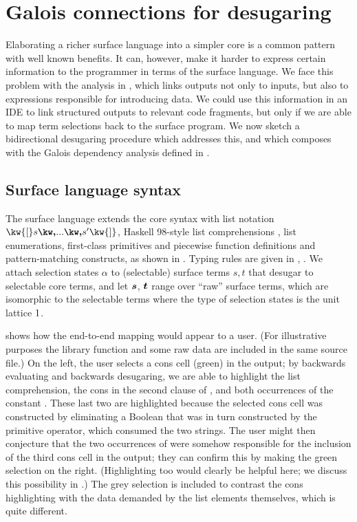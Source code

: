 \newpage
\section{Galois connections for desugaring}
\label{sec:surface-language}

Elaborating a richer surface language into a simpler core is a common pattern with well known benefits. It can, however, make it harder to express certain information to the programmer in terms of the surface language. We face this problem with the analysis in , which links outputs not only to inputs, but also to expressions responsible for introducing data. We could use this information in an IDE to link structured outputs to relevant code fragments, but only if we are able to map term selections back to the surface program. We now sketch a bidirectional desugaring procedure which addresses this, and which composes with the Galois dependency analysis defined in .



\subsection{Surface language syntax}

The surface language \OurLanguage{} extends the core syntax with list notation $\kw{[} s \comma \ldots \comma s' \kw{]}$, Haskell 98-style list comprehensions \cite{peytonJones03}, list enumerations, first-class primitives and piecewise function definitions and pattern-matching constructs, as shown in . Typing rules are \ifappendices given in , \else \IncludedWithSupplementaryMaterial\fi. We attach selection states $\alpha$ to (selectable) surface terms $s, t$ that desugar to selectable core terms, and let $\bm{s}$, $\bm{t}$ range over ``raw'' surface terms, which are isomorphic to the selectable terms where the type of selection states is the unit lattice $1$.

 shows how the end-to-end mapping would appear to a user. (For illustrative purposes the library function  and some raw data are included in the same source file.) On the left, the user selects a cons cell (green) in the output; by backwards evaluating and backwards desugaring, we are able to highlight the list comprehension, the cons in the second clause of , and both occurrences of the constant . These last two are highlighted because the selected cons cell was constructed by eliminating a Boolean that was in turn constructed by the primitive \kw{==} operator, which consumed the two strings. The user might then conjecture that the two occurrences of  were somehow responsible for the inclusion of the third cons cell in the output; they can confirm this by making the green selection on the right. (Highlighting \kw{==} too would clearly be helpful here; we discuss this possibility in .) The grey selection is included to contrast the cons highlighting with the data demanded by the list elements themselves, which is quite different.

